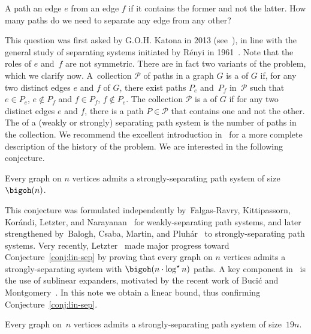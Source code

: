 A path  an edge $e$ from an edge $f$ if it contains the former and not the latter. How many paths do we need to separate any edge from any other?

This question was first asked by G.O.H. Katona in 2013 (see~\cite{falgas2013separating}), in line with the general study of separating systems initiated by R\'enyi in 1961~\cite{renyi1961random}. Note that the roles of $e$ and~$f$ are not symmetric. There are in fact two variants of the problem, which we clarify now. A~collection $\mathcal{P}$ of paths in a graph $G$ is a  of $G$ if, for any two distinct edges $e$ and $f$ of $G$, there exist paths $P_e$ and~$P_f$ in~$\mathcal{P}$ such that $e \in P_e$, $e \not\in P_f$ and $f\in P_f$, $f \not\in P_e$.
The collection $\mathcal{P}$ is a  of $G$ if for any two distinct edges $e$ and $f$, there is a path $P \in \mathcal{P}$ that contains one and not the other.
The  of a (weakly or strongly) separating path system is the number of paths in the collection.
We recommend the excellent introduction in~\cite{letzter2022separating} for a more complete description of the history of the problem.
We are interested in the following conjecture.

\begin{conjecture}\label{conj:lin-sep}
Every graph on $n$ vertices admits a strongly-separating path system of size $\bigoh(n)$.
\end{conjecture}



This conjecture was formulated independently by~Falgas-Ravry, Kittipassorn, Kor\'andi, Letzter, and Narayanan~\cite{falgas2013separating} for weakly-separating path systems,
and later strengthened by~Balogh, Csaba, Martin, and Pluh\'ar~\cite{balogh2016path} to strongly-separating path systems.
Very recently, Letzter~\cite{letzter2022separating} made
major progress toward Conjecture~\ref{conj:lin-sep} by proving
that every graph on \(n\) vertices admits a strongly-separating
system with $\bigoh(n\cdot \log^\star n)$ paths. A key component
in~\cite{letzter2022separating} is the use of sublinear
expanders, motivated by the recent work of Buci\'c and
Montgomery~\cite{bucic2022towards}.
 In this note we obtain a linear bound, thus confirming Conjecture~\ref{conj:lin-sep}.

\begin{theorem}\label{thm:main}
  Every graph on~$n$ vertices	admits a strongly-separating path system of size~\(19n\).
\end{theorem}


